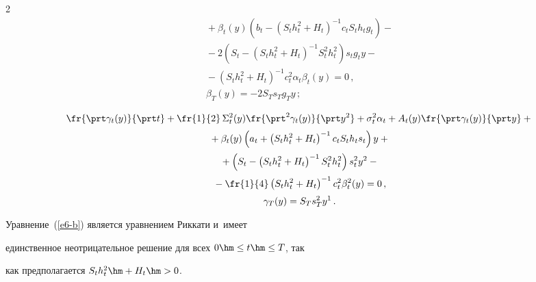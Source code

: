\begin{multicols}{2}
\begin{multline}
{}+\beta_t(y) \left( b_t-\left( S_t h_t^2+H_t\right)^{-1} c_t S_t h_t 


g_t\right)-{}\\[2pt]


{}-2\left( S_t-\left( S_t h_t^2+H_t\right)^{-1} S_t^2 h_t^2\right) s_t g_t y-{}\\[2pt]


{}-\left( 


S_t h_t^2+H_t\right)^{-1} c_t^2 \alpha_t \beta_t(y)=0\,,\\[2pt]


\beta_T(y)=-2S_T s_T g_T y\,;


\label{e7-b}


\end{multline}





\vspace*{-12pt}





\begin{multline}


\fr{\prt \gamma_t(y)}{\prt  t}+\fr{1}{2}\,\Sigma_t^2(y)\fr{\prt^2 


\gamma_t(y)}{\prt y^2} +\sigma^2_t \alpha_t +A_t(y) \fr{\prt \gamma_t(y)}{\prt 


y}+{}\\[2pt]


{}+ \beta_t(y)\left( a_t+\left( S_t h_t^2+H_t\right)^{-1} c_t S_t h_t s_t\right) 


y+{}\\[2pt]


{}+\left( S_t- \left( S_t h_t^2 +H_t\right)^{-1} S_t^2 h_t^2\right) s_t^2 y^2-{}\\[2pt]


{}-\fr{1}{4}\left( S_t h_t^2 +H_t\right)^{-1} c_t^2 \beta_t^2(y)=0\,,\\[2pt] 


\gamma_T(y)=S_T s_T^2 y^1\,.


\label{e8-b}


\end{multline}


     


     Уравнение~(\ref{e6-b}) является уравнением Риккати и~имеет 


единственное неотрицательное решение для всех $0\hm\leq t\hm\leq T$, так 


как предполагается $S_t h_t^2\hm+ H_t\hm>0$. 



\end{multicols}
